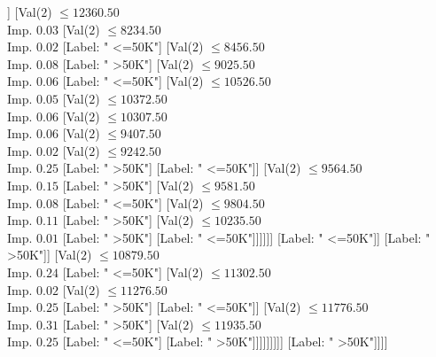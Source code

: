 \documentclass[margin=10pt]{standalone}
\begin{document}
\begin{forest}
															[Label: " >50K"]]
														[Val($2$) $ \leq 12360.50$ \\ Imp. $0.03$
															[Val($2$) $ \leq 8234.50$ \\ Imp. $0.02$
																[Label: " <=50K"]
																[Val($2$) $ \leq 8456.50$ \\ Imp. $0.08$
																	[Label: " >50K"]
																	[Val($2$) $ \leq 9025.50$ \\ Imp. $0.06$
																		[Label: " <=50K"]
																		[Val($2$) $ \leq 10526.50$ \\ Imp. $0.05$
																			[Val($2$) $ \leq 10372.50$ \\ Imp. $0.06$
																				[Val($2$) $ \leq 10307.50$ \\ Imp. $0.06$
																					[Val($2$) $ \leq 9407.50$ \\ Imp. $0.02$
																						[Val($2$) $ \leq 9242.50$ \\ Imp. $0.25$
																							[Label: " >50K"]
																							[Label: " <=50K"]]
																						[Val($2$) $ \leq 9564.50$ \\ Imp. $0.15$
																							[Label: " >50K"]
																							[Val($2$) $ \leq 9581.50$ \\ Imp. $0.08$
																								[Label: " <=50K"]
																								[Val($2$) $ \leq 9804.50$ \\ Imp. $0.11$
																									[Label: " >50K"]
																									[Val($2$) $ \leq 10235.50$ \\ Imp. $0.01$
																										[Label: " >50K"]
																										[Label: " <=50K"]]]]]]
																					[Label: " <=50K"]]
																				[Label: " >50K"]]
																			[Val($2$) $ \leq 10879.50$ \\ Imp. $0.24$
																				[Label: " <=50K"]
																				[Val($2$) $ \leq 11302.50$ \\ Imp. $0.02$
																					[Val($2$) $ \leq 11276.50$ \\ Imp. $0.25$
																						[Label: " >50K"]
																						[Label: " <=50K"]]
																					[Val($2$) $ \leq 11776.50$ \\ Imp. $0.31$
																						[Label: " >50K"]
																						[Val($2$) $ \leq 11935.50$ \\ Imp. $0.25$
																							[Label: " <=50K"]
																							[Label: " >50K"]]]]]]]]]
															[Label: " >50K"]]]]

\end{forest}
\end{document}
